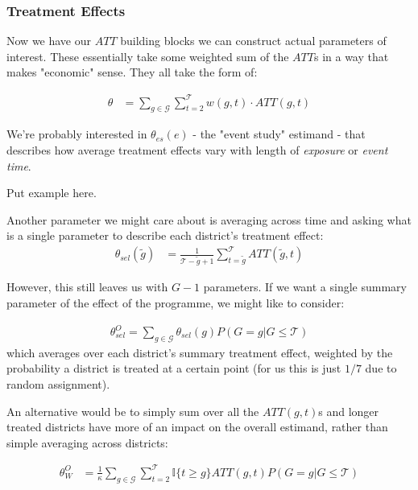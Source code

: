 \documentclass{article}
\begin{document}
  \subsubsection*{Treatment Effects} 
   Now we have our $ATT$ building blocks we can construct actual parameters of
   interest. These essentially take some weighted sum of the $ATT$s in a way that 
   makes "economic" sense. They all take the form of:

   \begin{align*}
      \theta &= \sum_{g \in \mathcal{G}}\sum_{t=2}^\mathcal{T} w(g,t)\cdot ATT(g,t)
   \end{align*}

   We're probably interested in $\theta_{es}(e)$ - the "event study" estimand - that 
   describes how average treatment effects vary with length of \textit{exposure} or 
   \textit{event time}.


   Put example here.

   Another parameter we might care about is averaging across time and asking 
   what is a single parameter to describe each district's treatment effect:
   \begin{align*}
      \theta_{sel}(\tilde{g}) &= \frac{1}{\mathcal{T} - \tilde{g} + 1} \sum_{t = \tilde{g}}^\mathcal{T} ATT(\tilde{g}, t)
   \end{align*}

   However, this still leaves us with $G-1$ parameters. If we want a single 
   summary parameter of the effect of the programme, we might like to consider:

   \begin{align*}
      \theta_{sel}^O = \sum_{g \in \mathcal{G}} \theta_{sel}(g) P(G = g | G \leq \mathcal{T})
   \end{align*}
   which averages over each district's summary treatment effect, weighted by the 
   probability a district is treated at a certain point (for us this is just $1/7$ 
   due to random assignment).


   An alternative would be to simply sum over all the $ATT(g,t)$s and longer 
   treated districts have more of an impact on the overall estimand, rather than simple 
   averaging across districts:

   \begin{align*}
      \theta_W^O &= \frac{1}{\kappa} \sum_{g \in \mathcal{G}} \sum_{t=2}^\mathcal{T} 
      \mathbb{I}\{t \geq g\} ATT(g,t) P(G = g | G \leq \mathcal{T})
   \end{align*}
\end{document}
